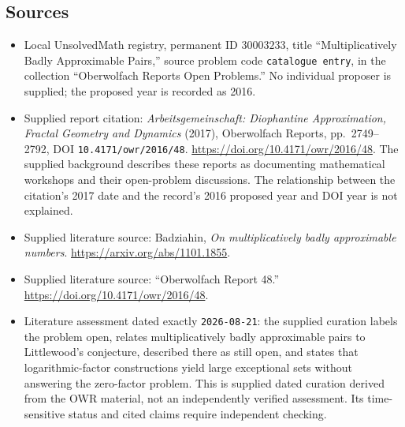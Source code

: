 \documentclass[11pt]{article}
\begin{document}
\subsection{Sources}
\begin{itemize}
\item Local UnsolvedMath registry, permanent ID \(30003233\), title ``Multiplicatively Badly Approximable Pairs,'' source problem code \texttt{catalogue entry}, in the collection ``Oberwolfach Reports Open Problems.'' No individual proposer is supplied; the proposed year is recorded as 2016.
\item Supplied report citation: \emph{Arbeitsgemeinschaft: Diophantine Approximation, Fractal Geometry and Dynamics} (2017), Oberwolfach Reports, pp.\ 2749--2792, DOI \texttt{10.4171/owr/2016/48}. \url{https://doi.org/10.4171/owr/2016/48}. The supplied background describes these reports as documenting mathematical workshops and their open-problem discussions. The relationship between the citation's 2017 date and the record's 2016 proposed year and DOI year is not explained.
\item Supplied literature source: Badziahin, \emph{On multiplicatively badly approximable numbers}. \url{https://arxiv.org/abs/1101.1855}.
\item Supplied literature source: ``Oberwolfach Report 48.'' \url{https://doi.org/10.4171/owr/2016/48}.
\item Literature assessment dated exactly \texttt{2026-08-21}: the supplied curation labels the problem open, relates multiplicatively badly approximable pairs to Littlewood's conjecture, described there as still open, and states that logarithmic-factor constructions yield large exceptional sets without answering the zero-factor problem. This is supplied dated curation derived from the OWR material, not an independently verified assessment. Its time-sensitive status and cited claims require independent checking.
\end{itemize}
\end{document}
